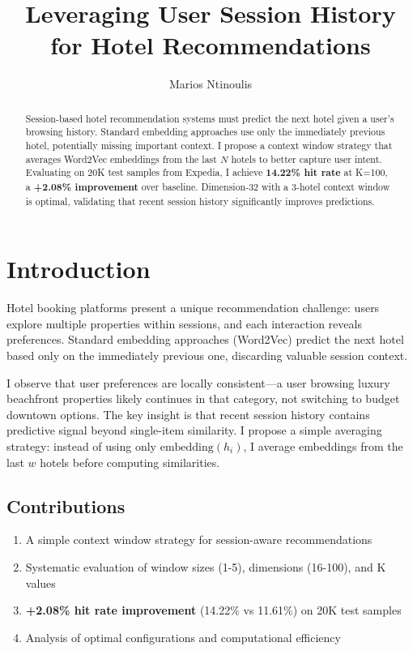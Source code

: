 \documentclass[sigconf]{acmart}
\title{Leveraging User Session History for Hotel Recommendations}
\author{Marios Ntinoulis}
\affiliation{%
  \institution{Master of Science in Data Science}
  \institution{University of Nicosia}
  \country{Cyprus}}
\begin{document}
\begin{abstract}
Session-based hotel recommendation systems must predict the next hotel given a user's browsing history. Standard embedding approaches use only the immediately previous hotel, potentially missing important context. I propose a context window strategy that averages Word2Vec embeddings from the last $N$ hotels to better capture user intent. Evaluating on 20K test samples from Expedia, I achieve \textbf{14.22\% hit rate} at K=100, a \textbf{+2.08\% improvement} over baseline. Dimension-32 with a 3-hotel context window is optimal, validating that recent session history significantly improves predictions.
\end{abstract}

\maketitle

\section{Introduction}

Hotel booking platforms present a unique recommendation challenge: users explore multiple properties within sessions, and each interaction reveals preferences. Standard embedding approaches (Word2Vec) predict the next hotel based only on the immediately previous one, discarding valuable session context.

I observe that user preferences are locally consistent—a user browsing luxury beachfront properties likely continues in that category, not switching to budget downtown options. The key insight is that recent session history contains predictive signal beyond single-item similarity. I propose a simple averaging strategy: instead of using only $\text{embedding}(h_i)$, I average embeddings from the last $w$ hotels before computing similarities.

\subsection{Contributions}

\begin{enumerate}
\item A simple context window strategy for session-aware recommendations
\item Systematic evaluation of window sizes (1-5), dimensions (16-100), and K values
\item \textbf{+2.08\% hit rate improvement} (14.22\% vs 11.61\%) on 20K test samples
\item Analysis of optimal configurations and computational efficiency
\end{enumerate}
\end{document}
